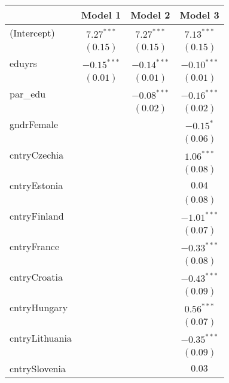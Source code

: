 
\begin{table}
\begin{center}
\begin{tabular}{l c c c}
\hline
 & Model 1 & Model 2 & Model 3 \\
\hline
(Intercept)    & $7.27^{***}$  & $7.27^{***}$  & $7.13^{***}$  \\
               & $(0.15)$      & $(0.15)$      & $(0.15)$      \\
eduyrs         & $-0.15^{***}$ & $-0.14^{***}$ & $-0.10^{***}$ \\
               & $(0.01)$      & $(0.01)$      & $(0.01)$      \\
par\_edu       &               & $-0.08^{***}$ & $-0.16^{***}$ \\
               &               & $(0.02)$      & $(0.02)$      \\
gndrFemale     &               &               & $-0.15^{*}$   \\
               &               &               & $(0.06)$      \\
cntryCzechia   &               &               & $1.06^{***}$  \\
               &               &               & $(0.08)$      \\
cntryEstonia   &               &               & $0.04$        \\
               &               &               & $(0.08)$      \\
cntryFinland   &               &               & $-1.01^{***}$ \\
               &               &               & $(0.07)$      \\
cntryFrance    &               &               & $-0.33^{***}$ \\
               &               &               & $(0.08)$      \\
cntryCroatia   &               &               & $-0.43^{***}$ \\
               &               &               & $(0.09)$      \\
cntryHungary   &               &               & $0.56^{***}$  \\
               &               &               & $(0.07)$      \\
cntryLithuania &               &               & $-0.35^{***}$ \\
               &               &               & $(0.09)$      \\
cntrySlovenia  &               &               & $0.03$        \\

\end{tabular}
\end{center}
\end{table}
